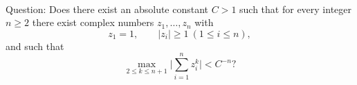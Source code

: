 \\
Question: Does there exist an absolute constant $C>1$ such that for every integer $n\ge 2$ there exist complex numbers $z_1,\dots,z_n$ with
\[
 z_1=1,\qquad |z_i|\ge 1\ (1\le i\le n),
\]
and such that
\[
 \max_{2\le k\le n+1}\Big|\sum_{i=1}^n z_i^k\Big| < C^{-n}?
\]
